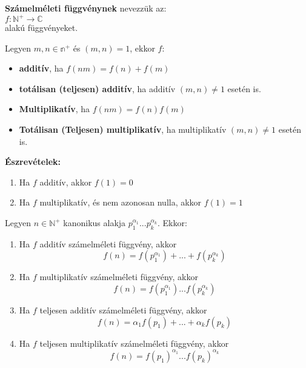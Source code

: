 \begin{frame}
  \begin{tcolorbox}[title={Def.: A számelméleti függvények}]
    \textbf{Számelméleti függvénynek} nevezzük az:\\
    $f : \mathbb{N}^+ \rightarrow \mathbb{C}$\\
    alakú függvényeket.\\
    \mmedskip

    Legyen $m, n \in \mathbb{n}^+$ és $(m, n) = 1$, ekkor $f$:
    \begin{itemize}
      \item \textbf{additív}, ha $f(nm) = f(n) + f(m)$
      \item \textbf{totálisan (teljesen) additív}, ha additív $(m, n) \neq 1$ esetén is.
      \item \textbf{Multiplikatív}, ha $f(nm) = f(n)f(m)$
      \item \textbf{Totálisan (Teljesen) multiplikatív}, ha multiplikatív $(m, n) \neq 1$ esetén is.
    \end{itemize}
  \tcblower
    \textbf{Észrevételek:}\\
    \begin{enumerate}
      \item Ha $f$ additív, akkor $f(1) = 0$
      \item Ha $f$ multiplikatív, és nem azonosan nulla, akkor $f(1) = 1$
    \end{enumerate}
  \end{tcolorbox}

  \begin{tcolorbox}[title={Tétel: Számelméleti függvények}]
    Legyen $n \in \mathbb{N}^+$ kanonikus alakja $p_1^{{\alpha}_1}...p_k^{{\alpha}_k}$. Ekkor:\\
    \begin{enumerate}
      \item Ha $f$ additív számelméleti függvény, akkor $$f(n) = f(p_1^{{\alpha}_1}) + ... + f(p_k^{{\alpha}_k})$$
      \item Ha $f$ multiplikatív számelméleti függvény, akkor $$f(n) = f(p_1^{{\alpha}_1})...f(p_k^{{\alpha}_k})$$
      \item Ha $f$ teljesen additív számelméleti függvény, akkor $$f(n) = {\alpha}_1f(p_1) + ... + {\alpha}_kf(p_k)$$
      \item Ha $f$ teljesen multiplikatív számelméleti függvény, akkor $$f(n) = f(p_1)^{{\alpha}_1}...f(p_k)^{{\alpha}_k}$$
    \end{enumerate}
  \end{tcolorbox}
\end{frame}


